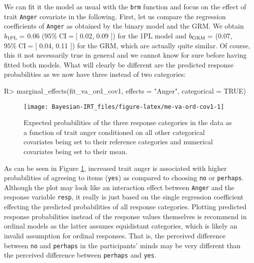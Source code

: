 \documentclass[jss]{jss}
\begin{document}
We can fit it the model as usual with the \texttt{brm} function and
focus on the effect of trait \texttt{Anger} covariate in the following.
First, let us compare the regression coefficients of \texttt{Anger} as
obtained by the binary model and the GRM. We obtain \(b_{\rm 1PL} =\)
0.06 (\(95\% \; \text{CI} = [\) 0.02, 0.09 \(]\)) for the 1PL model and
\(b_{\rm GRM} =\) (0.07, \(95\% \; \text{CI} = [\) 0.04, 0.11 \(]\)) for
the GRM, which are actually quite similar. Of course, this it not
necessarily true in general and we cannot know for sure before having
fitted both models. What will clearly be different are the predicted
response probabilities as we now have three instead of two categories:

\begin{CodeChunk}

\begin{CodeInput}
R> marginal_effects(fit_va_ord_cov1, effects = "Anger", categorical = TRUE)
\end{CodeInput}
\begin{figure}

{\centering \texttt{[image: Bayesian-IRT\_files/figure-latex/me-va-ord-cov1-1]} 

}

\caption[Expected probabilities of the three response categories in the  data as a function of trait anger conditioned on all other categorical covariates being set to their reference categories and numerical covariates being set to their mean]{Expected probabilities of the three response categories in the  data as a function of trait anger conditioned on all other categorical covariates being set to their reference categories and numerical covariates being set to their mean.}\label{fig:me-va-ord-cov1}
\end{figure}
\end{CodeChunk}

As can be seen in Figure \ref{fig:me-va-ord-cov1}, increased trait anger
is associated with higher probabilities of agreeing to items
(\texttt{yes}) as compared to choosing \texttt{no} or \texttt{perhaps}.
Although the plot may look like an interaction effect between
\texttt{Anger} and the response variable \texttt{resp}, it really is
just based on the single regression coefficient effecting the predicted
probabilities of all response categories. Plotting predicted response
probabilities instead of the response values themselves is recommend in
ordinal models as the latter assumes equidistant categories, which is
likely an invalid assumption for ordinal responses. That is, the
perceived difference between \texttt{no} and \texttt{perhaps} in the
participants' minds may be very different than the perceived difference
between \texttt{perhaps} and \texttt{yes}.
\end{document}
